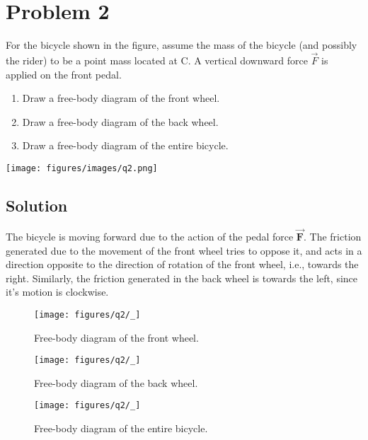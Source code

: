 \section*{Problem 2}

For the bicycle shown in the figure, assume the mass of the bicycle (and possibly the rider) to be a point mass located at C.
A vertical downward force \( \vec{F} \) is applied on the front pedal.

\begin{enumerate}[label = (\alph*)]
    \item Draw a free-body diagram of the front wheel.
    \item Draw a free-body diagram of the back wheel.
    \item Draw a free-body diagram of the entire bicycle.
\end{enumerate}

\begin{figure*}[h]
    \centering
    \texttt{[image: figures/images/q2.png]}
\end{figure*}

\subsection*{Solution}

The bicycle is moving forward due to the action of the pedal force \( \vec{\mathbf{F}} \).
The friction generated due to the movement of the front wheel tries to oppose it, and acts in a direction opposite to the direction of rotation of the front wheel, i.e., towards the right.
Similarly, the friction generated in the back wheel is towards the left, since it's motion is clockwise.

\begin{figure}[htbp]
    \centering
    \texttt{[image: figures/q2/\_]}
    \caption{
        Free-body diagram of the front wheel.
    }
\end{figure}

\begin{figure}[htbp]
    \centering
    \texttt{[image: figures/q2/\_]}
    \caption{
        Free-body diagram of the back wheel.
    }
\end{figure}

\begin{figure}[htbp]
    \centering
    \texttt{[image: figures/q2/\_]}
    \caption{
        Free-body diagram of the entire bicycle.
    }
\end{figure}
